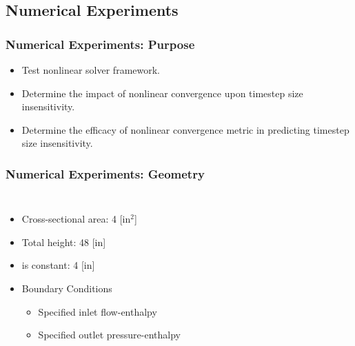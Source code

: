 \documentclass[compress,xcolor=table]{beamer}
\begin{document}
\subsection[Experiments]{Numerical Experiments}
\begin{frame}
\frametitle{Numerical Experiments: Purpose}

\begin{itemize}
\item{Test nonlinear solver framework.}
\item{Determine the impact of nonlinear convergence upon timestep size insensitivity.}
\item{Determine the efficacy of nonlinear convergence metric in predicting timestep size insensitivity.}
\end{itemize}

\end{frame}
\begin{frame}
\frametitle{Numerical Experiments: Geometry}
\begin{columns}

\begin{itemize}
\item{Cross-sectional area: 4 [in$^2$]}
\item{Total height: 48 [in]}
\item{\dx{} is constant: 4 [in]}
\item{ Boundary Conditions
	\begin{itemize}
	\item{Specified inlet flow-enthalpy}
	\item{Specified outlet pressure-enthalpy}
\end{itemize}
}
\end{itemize}

\begin{figure}[h!t]
\centering
{}
\end{figure}
\end{columns}
\end{frame}
\end{document}
